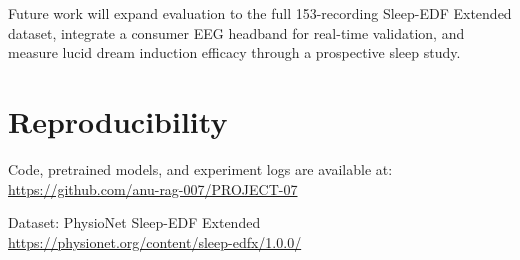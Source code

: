 \documentclass[journal]{IEEEtran}
\begin{document}
Future work will expand evaluation to the full
153-recording Sleep-EDF Extended dataset, integrate
a consumer EEG headband for real-time validation,
and measure lucid dream induction efficacy through
a prospective sleep study.

\appendix
\section{Reproducibility}

Code, pretrained models, and experiment logs are
available at:
\url{https://github.com/anu-rag-007/PROJECT-07}

Dataset: PhysioNet Sleep-EDF Extended\\
\url{https://physionet.org/content/sleep-edfx/1.0.0/}



\end{document}
